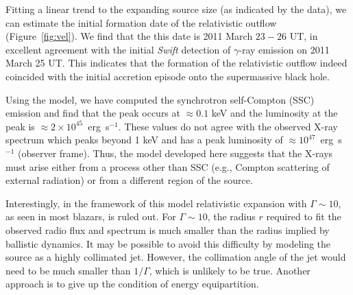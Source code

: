 Fitting a linear trend to the expanding source size (as indicated by
the data), we can estimate the initial formation date of the
relativistic outflow (Figure~\ref{fig:vel}).  We find that the this
date is 2011 March $23-26$ UT, in excellent agreement with
the initial {\it Swift} detection of $\gamma$-ray emission on 2011
March 25 UT.  This indicates that the formation of the relativistic
outflow indeed coincided with the initial accretion episode onto the
supermassive black hole.

Using the model, we have computed the synchrotron self-Compton (SSC)
emission and find that the peak occurs at $\approx 0.1$ keV and the
luminosity at the peak is $\approx 2\times 10^{45}$~erg~s$^{-1}$.
These values do not agree with the observed X-ray spectrum which peaks
beyond 1 keV and has a peak luminosity of $\approx 10^{47}$~erg~s$^{-1}$ 
(observer frame).  Thus, the model developed here suggests
that the X-rays must arise either from a process other than SSC (e.g.,
Compton scattering of external radiation) or from a different region
of the source.

Interestingly, in the framework of this model relativistic expansion
with $\Gamma\sim 10$, as seen in most blazars, is ruled out.  For
$\Gamma\sim 10$, the radius $r$ required to fit the observed radio
flux and spectrum is much smaller than the radius implied by ballistic
dynamics.  It may be possible to avoid this difficulty by modeling the
source as a highly collimated jet.  However, the collimation angle of
the jet would need to be much smaller than $1/\Gamma$, which is
unlikely to be true.  Another approach is to give up the condition of
energy equipartition.


